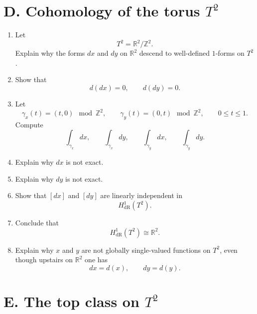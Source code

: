 \documentclass[11pt]{article}
\begin{document}
	\section*{D. Cohomology of the torus \(T^2\)}
	
	\begin{enumerate}[leftmargin=2em,label=\textbf{D\arabic*.}]
		\item Let
		\[
		T^2=\mathbb{R}^2/\mathbb{Z}^2.
		\]
		Explain why the forms \(dx\) and \(dy\) on \(\mathbb{R}^2\) descend to well-defined \(1\)-forms on \(T^2\).
		
		\item Show that
		\[
		d(dx)=0,\qquad d(dy)=0.
		\]
		
		\item Let
		\[
		\gamma_x(t)=(t,0)\mod\mathbb{Z}^2,\qquad
		\gamma_y(t)=(0,t)\mod\mathbb{Z}^2,
		\qquad 0\le t\le 1.
		\]
		Compute
		\[
		\int_{\gamma_x}dx,\qquad \int_{\gamma_x}dy,\qquad
		\int_{\gamma_y}dx,\qquad \int_{\gamma_y}dy.
		\]
		
		\item Explain why \(dx\) is not exact.
		
		\item Explain why \(dy\) is not exact.
		
		\item Show that \([dx]\) and \([dy]\) are linearly independent in
		\[
		H^1_{\mathrm{dR}}(T^2).
		\]
		
		\item Conclude that
		\[
		H^1_{\mathrm{dR}}(T^2)\cong \mathbb{R}^2.
		\]
		
		\item Explain why \(x\) and \(y\) are not globally single-valued functions on \(T^2\), even though upstairs on \(\mathbb{R}^2\) one has
		\[
		dx=d(x),\qquad dy=d(y).
		\]
	\end{enumerate}
	
	\section*{E. The top class on \(T^2\)}
	
\end{document}

